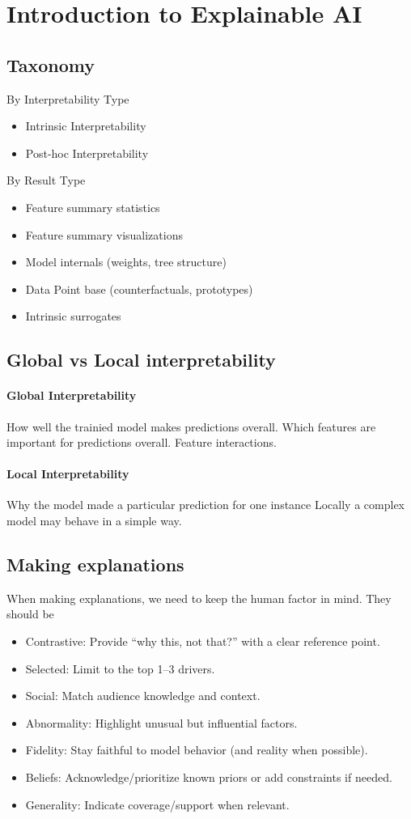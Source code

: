 \section{Introduction to Explainable AI}
\subsection{Taxonomy}
By Interpretability Type
\begin{itemize}
	\item Intrinsic Interpretability
	\item Post-hoc Interpretability
\end{itemize}
By Result Type
\begin{itemize}
	\item Feature summary statistics
	\item Feature summary visualizations
	\item Model internals (weights, tree structure)
	\item Data Point base (counterfactuals, prototypes)
	\item Intrinsic surrogates
\end{itemize}
\subsection{Global vs Local interpretability}
\paragraph{Global Interpretability}
How well the trainied model makes predictions overall.
Which features are important for predictions overall.
Feature interactions.
\paragraph{Local Interpretability}
Why the model made a particular prediction for one instance
Locally a complex model may behave in a simple way.

\subsection{Making explanations}
When making explanations, we need to keep the human factor in mind.
They should be
\begin{itemize}
	\item Contrastive: Provide “why this, not that?” with a clear reference point.
	\item Selected: Limit to the top 1–3 drivers.
	\item Social: Match audience knowledge and context.
	\item Abnormality: Highlight unusual but influential factors.
	\item Fidelity: Stay faithful to model behavior (and reality when possible).
	\item Beliefs: Acknowledge/prioritize known priors or add constraints if needed.
	\item Generality: Indicate coverage/support when relevant.
\end{itemize}
